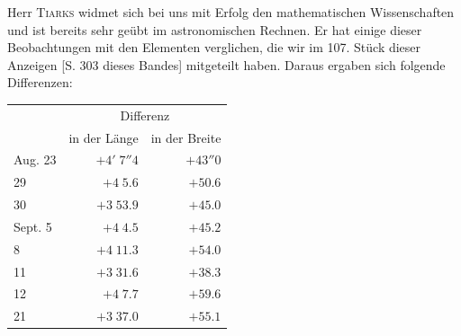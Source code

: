 \par\indent Herr \textsc{Tiarks} widmet sich bei uns mit Erfolg den mathematischen Wissenschaften und ist bereits sehr geübt im astronomischen Rechnen. Er hat einige dieser Beobachtungen mit den Elementen verglichen, die wir im 107. Stück dieser Anzeigen [S. 303 dieses Bandes] mitgeteilt haben. Daraus ergaben sich folgende Differenzen:


\begin{center}\fontsize{10}{12}\selectfont\setlength{\tabcolsep}{5pt}\renewcommand{\arraystretch}{1.15}\begin{tabular}{lrr}
 & \multicolumn{2}{c}{Differenz}\\
 & in der Länge & in der Breite\\\hline
Aug. 23 & $+4'\;7''4$ & $+43''0$\\
29 & $+4\;5.6$ & $+50.6$\\
30 & $+3\;53.9$ & $+45.0$\\
Sept. 5 & $+4\;4.5$ & $+45.2$\\
8 & $+4\;11.3$ & $+54.0$\\
11 & $+3\;31.6$ & $+38.3$\\
12 & $+4\;7.7$ & $+59.6$\\
21 & $+3\;37.0$ & $+55.1$\\
\end{tabular}\end{center}


